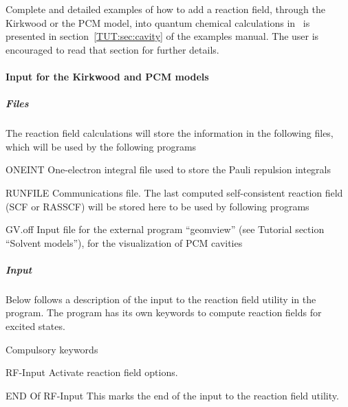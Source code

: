Complete and detailed examples of how to add a reaction field,
through the Kirkwood or the PCM model, into quantum chemical
calculations in \molcas\ is presented in section~\ref{TUT:sec:cavity} of the
examples manual. The user is encouraged to read that section for further details.


\paragraph{Input for the Kirkwood and PCM models}

\subparagraph{Files}
\label{UG:sec:rfield_files}


The reaction field calculations will store the information in the following files, which
will be used by the following programs

\begin{filelist}
\item[ONEINT]
One-electron integral file used to store the Pauli repulsion integrals
\item[RUNFILE]
Communications file. The last computed self-consistent reaction field (SCF or RASSCF)
will be stored here to be used by following programs
\item[GV.off]
Input file for the external program ``geomview'' (see Tutorial section
``Solvent models''), for the visualization of PCM cavities
\end{filelist}


\subparagraph{Input}
Below follows a description of the input to the reaction field utility in the
 program. The  program has
its own keywords to compute reaction fields for excited states.

Compulsory keywords
\begin{keywordlist}
\item[RF-Input]
Activate reaction field options.

\item[END Of RF-Input]
This marks the end of the input to the reaction field utility.
\end{keywordlist}

